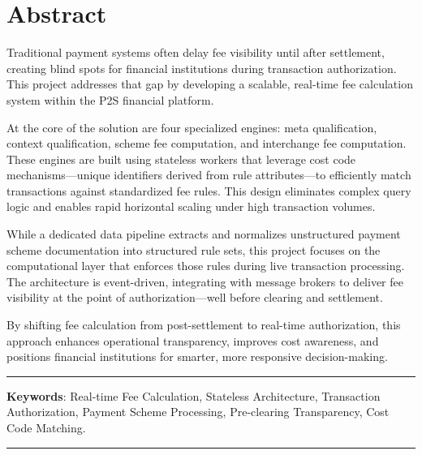 \section*{Abstract}

Traditional payment systems often delay fee visibility until after settlement, creating blind spots for financial institutions during transaction authorization. This project addresses that gap by developing a scalable, real-time fee calculation system within the P2S financial platform.

At the core of the solution are four specialized engines: meta qualification, context qualification, scheme fee computation, and interchange fee computation. These engines are built using stateless workers that leverage cost code mechanisms—unique identifiers derived from rule attributes—to efficiently match transactions against standardized fee rules. This design eliminates complex query logic and enables rapid horizontal scaling under high transaction volumes.

While a dedicated data pipeline extracts and normalizes unstructured payment scheme documentation into structured rule sets, this project focuses on the computational layer that enforces those rules during live transaction processing. The architecture is event-driven, integrating with message brokers to deliver fee visibility at the point of authorization—well before clearing and settlement.

By shifting fee calculation from post-settlement to real-time authorization, this approach enhances operational transparency, improves cost awareness, and positions financial institutions for smarter, more responsive decision-making.

\vspace{1cm}
\begin{flushleft}
\rule{\textwidth}{0.4pt}\par
\textbf{Keywords}: Real-time Fee Calculation, Stateless Architecture, Transaction Authorization, Payment Scheme Processing, Pre-clearing Transparency, Cost Code Matching.\par
\rule[0.55\baselineskip]{\textwidth}{0.4pt}
\end{flushleft}
\pagebreak
